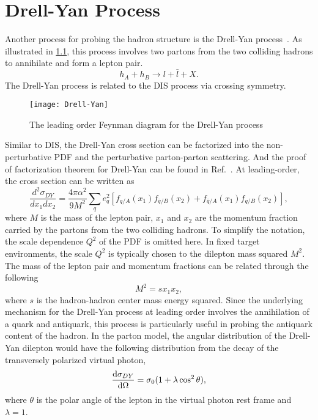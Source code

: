 \documentclass[../main.tex]{subfiles}
\begin{document}
\chapter{Drell-Yan Process}
\label{ch:DY}
Another process for probing the hadron structure is the Drell-Yan process~\cite{drell1970}.
As illustrated in \cref{fig:DY}, this process involves two partons from the
two colliding hadrons to annihilate and form a lepton pair.
\begin{equation}
	h_A + h_B \rightarrow l + \bar{l} + X.
\end{equation}
The Drell-Yan process is related to the DIS process via crossing symmetry.
\begin{figure}[htbp!]
	\centering
	\texttt{[image: Drell-Yan]}
	\caption{The leading order Feynman diagram for the Drell-Yan process}
	\label{fig:DY}
\end{figure}
Similar to DIS, the Drell-Yan cross section can be factorized into the non-perturbative
PDF and the perturbative parton-parton scattering. And the proof of factorization
theorem for Drell-Yan can be found in Ref.~\cite{collins1989}. At leading-order,
the cross section can be written as
\begin{equation}
	\frac{d^2\sigma_{DY}}{dx_{1}dx_{2}} = \frac{4\pi\alpha^2}{9M^2}\sum_q e^2_q
	\left[f_{q/A}\left(x_1\right)f_{\bar{q}/B}\left(x_2\right) +
	f_{\bar{q}/A}\left(x_1\right)f_{q/B}\left(x_2\right)
	\right],
	\label{eq:DY_cs}
\end{equation}
where $M$ is the mass of the lepton pair, $x_1$ and $x_2$ are the momentum fraction
carried by the partons from the two colliding hadrons. To simplify the notation,
the scale dependence $Q^2$ of the PDF is omitted here. In fixed target environments,
the scale $Q^2$ is typically chosen to the dilepton mass squared $M^2$.
The mass of the lepton pair and momentum fractions can be related through the following
\begin{equation}
	M^2= sx_1x_2,
	\label{eq:mass}
\end{equation}
where $s$ is the hadron-hadron center mass energy squared.
Since the underlying mechanism for the Drell-Yan process at leading order involves the annihilation
of a quark and antiquark, this process is particularly useful in probing the antiquark
content of the hadron.
In the parton model, the angular distribution of the Drell-Yan dilepton would have the following
distribution from the decay of the transversely polarized virtual photon,
\begin{equation}
	\dv{\sigma_{DY}}{\Omega} = \sigma_0(1+\lambda \cos^2\theta),
\end{equation}
where $\theta$ is the polar angle of the lepton in the virtual photon rest frame and $\lambda=1$.
\end{document}
